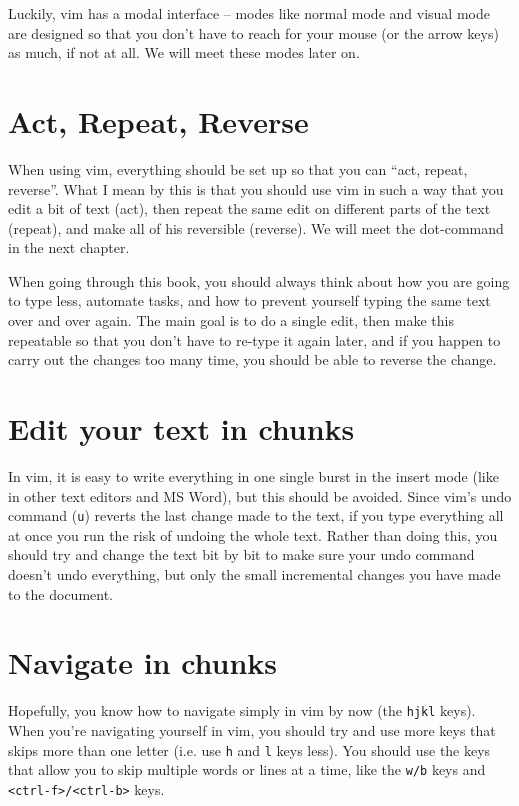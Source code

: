 Luckily, vim has a modal interface -- modes like normal mode and visual mode are designed so that you don't have to reach for your mouse (or the arrow keys) as much, if not at all.
We will meet these modes later on.

\section{Act, Repeat, Reverse}

When using vim, everything should be set up so that you can ``act, repeat, reverse''.
What I mean by this is that you should use vim in such a way that you edit a bit of text (act), then repeat the same edit on different parts of the text (repeat), and make all of his reversible (reverse).
We will meet the dot-command in the next chapter.

When going through this book, you should always think about how you are going to type less, automate tasks, and how to prevent yourself typing the same text over and over again.
The main goal is to do a single edit, then make this repeatable so that you don't have to re-type it again later, and if you happen to carry out the changes too many time, you should be able to reverse the change.

\section{Edit your text in chunks}

In vim, it is easy to write everything in one single burst in the insert mode (like in other text editors and MS Word), but this should be avoided.
Since vim's undo command (\verb|u|) reverts the last change made to  the text, if you type everything all at once you run the risk of undoing the whole text.
Rather than doing this, you should try and  change the text bit by bit to make sure your undo command doesn't undo everything, but only the small incremental changes you have made to the document.

\section{Navigate in chunks}

Hopefully, you know how to navigate simply in vim by now (the \verb|hjkl| keys).
When you're navigating yourself in vim, you should try and use more keys that skips more than one letter (i.e. use \verb|h| and \verb|l| keys less).
You should use the keys that allow you to skip multiple words or lines at a time, like the \verb|w/b| keys and \verb|<ctrl-f>/<ctrl-b>| keys.
